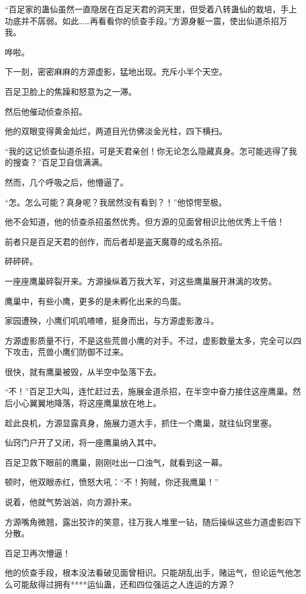\begin{this_body}
“百足家的蛊仙虽然一直隐居在百足天君的洞天里，但受着八转蛊仙的栽培，手上功底并不孱弱。如此……再看看你的侦查手段。”方源身躯一震，使出仙道杀招万我。

哗啦。

下一刻，密密麻麻的方源虚影，猛地出现。充斥小半个天空。

百足卫脸上的焦躁和怒意为之一滞。

然后他催动侦查杀招。

他的双眼变得黄金灿烂，两道目光仿佛淡金光柱，四下横扫。

“我的这记侦查仙道杀招，可是天君亲创！你无论怎么隐藏真身。怎可能逃得了我的搜查？”百足卫自信满满。

然而，几个呼吸之后，他懵逼了。

“怎。怎么可能？真身呢？我居然没有看到？！”他惊愕至极。

他不会知道，他的侦查杀招虽然优秀。但方源的见面曾相识比他优秀上千倍！

前者只是百足天君的创作，而后者却是盗天魔尊的成名杀招。

砰砰砰。

一座座鹰巢碎裂开来。方源操纵着万我大军，对这些鹰巢展开淋漓的攻势。

鹰巢中，有些小鹰，更多的是未孵化出来的鸟蛋。

家园遭殃，小鹰们叽叽喳喳，挺身而出，与方源虚影激斗。

方源虚影质量不行，不是这些荒兽小鹰的对手。不过，虚影数量太多，完全可以四下攻击，荒兽小鹰们防御不过来。

很快，就有鹰巢被毁，从半空中坠落下去。

“不！”百足卫大叫，连忙赶过去，施展金道杀招，在半空中奋力接住这座鹰巢。然后小心翼翼地降落，将这座鹰巢放在地上。

趁此良机，方源显露真身，施展力道大手，抓住一个鹰巢，就往仙窍里塞。

仙窍门户开了又闭，将一座鹰巢纳入其中。

百足卫救下眼前的鹰巢，刚刚吐出一口浊气，就看到这一幕。

顿时，他双眼赤红，愤怒大吼：“不！狗贼，你还我鹰巢！”

说着，他就气势汹汹，向方源扑来。

方源嘴角微翘，露出狡诈的笑意，往万我人堆里一钻，随后操纵这些力道虚影四下分散。

百足卫再次懵逼！

他的侦查手段，根本没法看破见面曾相识。只能胡乱出手，赌运气，但论运气他怎么可能敌得过拥有****运仙蛊，还和四位强运之人连运的方源？


\end{this_body}
